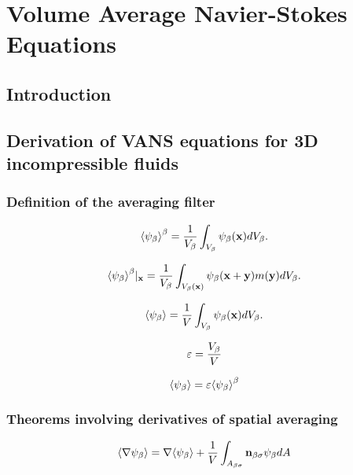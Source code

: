\chapter{Volume Average Navier-Stokes Equations}

\section{Introduction}


\section{Derivation of VANS equations for 3D incompressible fluids}
\subsection{Definition of the averaging filter}


\begin{equation}
{\left< \psi_{\beta} \right>}^{\beta} = \dfrac{1}{V_\beta} \int_{V_\beta} \psi_\beta (\mathbf{x}) d V_\beta.
\label{eq:avg_intrinsic}
\end{equation}


\begin{equation}
{\left< \psi_{\beta} \right>}^{\beta}|_{\mathbf{x}} = \dfrac{1}{V_\beta} \int_{V_\beta(\mathbf{x})} \psi_\beta (\mathbf{x} + \mathbf{y}) m(\mathbf{y}) d V_\beta.
\label{eq:avg_intrinsic_ext}
\end{equation}

\begin{equation}
{\left< \psi_{\beta} \right>} = \dfrac{1}{V} \int_{V_\beta} \psi_\beta (\mathbf{x}) d V_\beta.
\label{eq:avg_superficial}
\end{equation}


\begin{equation}
	\varepsilon = \dfrac{V_\beta}{V}
	\label{eq:porosity}
\end{equation}

\begin{equation}
	{\left< \psi_{\beta} \right>} =  \varepsilon {\left< \psi_{\beta} \right>}^{\beta}
\end{equation}

\subsection{Theorems involving derivatives of spatial averaging}

\begin{theorem}
\[	{\left< \nabla \psi_{\beta} \right>} = \nabla {\left< \psi_{\beta} \right>} + \dfrac{1}{V}\int_{A_{\beta \sigma}} \mathbf{n}_{\beta \sigma} \psi_{\beta} dA \]
\end{theorem}



